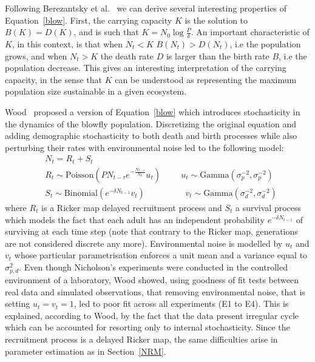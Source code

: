 \documentclass[12pt]{article}
\begin{document}
	Following Berezantsky et al.~\cite{berezansky2010nicholson} we can derive several interesting properties of Equation~\ref{blow}. First, the carrying capacity $K$ is the solution to $B(K)=D(K)$, and is such that $K=N_0\log\frac{P}{\delta}$. An important characteristic of $K$, in this context, is that when $N_t < K$ $B(N_t) > D(N_t)$, i.e the population grows, and when $N_t > K$ the death rate $D$ is larger than the birth rate $B$, i.e the population decrease. This gives an interesting interpretation of the carrying capacity, in the sense that $K$ can be understood as representing the maximum population size sustainable in a given ecosystem.
	
	Wood~\cite{wood2010statistical} proposed a version of Equation~\ref{blow} which introduces stochasticity in the dynamics of the blowfly population. Discretizing the original equation and adding demographic stochasticity to both death and birth processes while also perturbing their rates with environmental noise led to the following model:
	\begin{align}
	& N_t = R_t + S_t \\
	& R_t \sim  \mathrm{Poisson}(PN_{t-\tau}e^{-\frac{N_{t-\tau}}{N_0}}u_t)  \hspace{1cm} u_t \sim \mathrm{Gamma}(\sigma_p^{-2}, \sigma_p^{-2})\\ 
	& S_t \sim \mathrm{Binomial}(e^{-\delta N_{t-1}}v_t) \hspace{2cm}  v_t \sim \mathrm{Gamma}(\sigma_d^{-2}, \sigma_d^{-2}) 
	\end{align}
	where $R_t$ is a Ricker map delayed recruitment process and $S_t$ a survival process which models the fact that each adult has
	an independent probability $e^{-\delta N_{t-1}}$ of surviving at each time step (note that contrary to the Ricker map, generations are not considered discrete any more). Environmental noise is modelled by $u_t$ and $v_t$ whose particular parametrisation enforces a unit mean and a variance equal to $\sigma_{p,d}^2$. Even though Nicholson's experiments were conducted in the controlled environment of a laboratory, Wood showed, using goodness of fit tests between real data and simulated observations, that removing environmental noise, that is setting $u_t=v_t=1$, led to poor fit across all experiments (E1 to E4). This is explained, according to Wood, by the fact that the data present irregular cycle which can be accounted for resorting only to internal stochasticity. Since the recruitment process is a delayed Ricker map, the same difficulties arise in parameter estimation as in Section~\ref{NRM}.  
\end{document}
